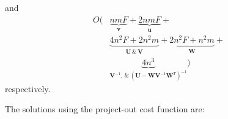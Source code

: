 and
\begin{equation}
    \begin{aligned}
        O( &
        \underbrace{nmF}_{\mathbf{v}}
        +
        \underbrace{2nmF}_{\mathbf{u}}
        +
        \\
        &
        \underbrace{4n^2F + 2n^2m}_{\mathbf{U} \, \& \, \mathbf{V}}
        +
        \underbrace{2n^2F + n^2m}_{\mathbf{W}}
        +
        \\
        &
        \underbrace{4n^3}_{\mathbf{V}^{-1},  \, \& \, \left( \mathbf{U} - \mathbf{W} \mathbf{V}^{-1} \mathbf{W}^T \right)^{-1} }
        )
    \label{eq:complexity_sim_bidirectional2_newton}
    \end{aligned}
\end{equation}
respectively.

The solutions using the project-out cost function are:

